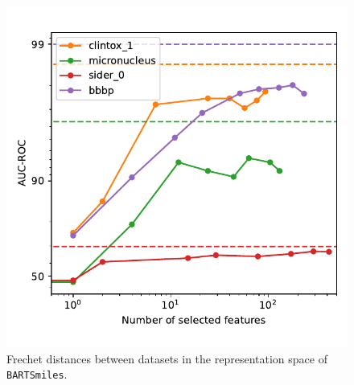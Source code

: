 \documentclass{article} %
\newcommand{\MODEL}{\texttt{BARTSmiles}}
\begin{document}
\begin{figure}[h]
\centering
\begin{minipage}[t]{0.45\columnwidth}
    \centering
    \includegraphics[width=0.9\columnwidth]{figures/sentiment.pdf}
    \caption{\small The AUC-ROC score plotted against the number of self-supervised features selected from \MODEL{}. Dashed lines indicate the performance achieved on the same dataset with full fine-tuning of the model.}
    \label{fig:num_features_vs_auc_roc}
\end{minipage}%
\qquad
\begin{minipage}[t]{0.45\columnwidth}
    \centering
    \caption{\small Frechet distances between datasets in the representation space of \MODEL{}.}
    \label{fig:frechet}
\end{minipage}
\end{figure}
\end{document}
